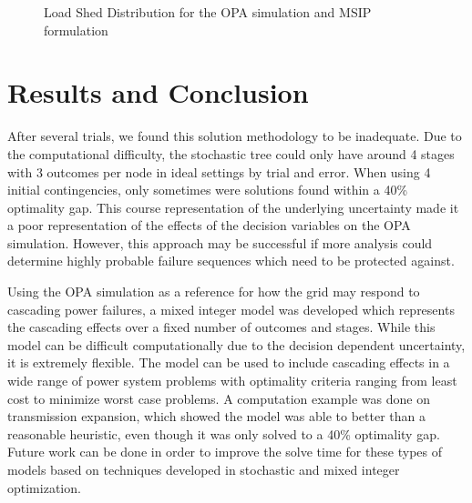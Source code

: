 \begin{figure}
 \centering
  \caption{Load Shed Distribution for the OPA simulation and MSIP formulation}
 \label{dist}
\end{figure}


\section{Results and Conclusion}
After several trials, we found this solution methodology to be inadequate.  Due to the computational difficulty, the stochastic tree could only have around 4 stages with 3 outcomes per node in ideal settings by trial and error.  When using 4 initial contingencies, only sometimes were solutions found within a 40\% optimality gap.  This course representation of the underlying uncertainty made it a poor representation of the effects of the decision variables on the OPA simulation.  However, this approach may be successful if more analysis could determine highly probable failure sequences which need to be protected against.

Using the OPA simulation as a reference for how the grid may respond to cascading power failures, a mixed integer model was developed which represents the cascading effects over a fixed number of outcomes and stages.  While this model can be difficult computationally due to the decision dependent uncertainty, it is extremely flexible.  The model can be used to include cascading effects in a wide range of power system problems with optimality criteria ranging from least cost to minimize worst case problems.  A computation example was done on transmission expansion, which showed the model was able to better than a reasonable heuristic, even though it was only solved to a 40\% optimality gap.  Future work can be done in order to improve the solve time for these types of models based on techniques developed in stochastic and mixed integer optimization.

